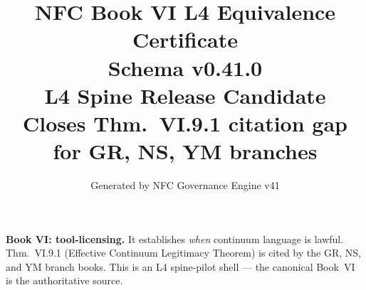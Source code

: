 \documentclass[11pt]{article}
\title{NFC Book VI L4 Equivalence Certificate\\[1ex]\large Schema v0.41.0\\[0.5ex]
\normalsize L4 Spine Release Candidate\\[0.5ex]
\small Closes Thm.~VI.9.1 citation gap for GR, NS, YM branches}
\author{Generated by NFC Governance Engine v41}
\date{}
\begin{document}
\maketitle
\tableofcontents
\bigskip
\noindent\textbf{Book VI: tool-licensing.} It establishes \emph{when} continuum
language is lawful. Thm.~VI.9.1 (Effective Continuum Legitimacy Theorem) is cited
by the GR, NS, and YM branch books. This is an L4 spine-pilot shell ---
the canonical Book~VI is the authoritative source.
\vspace{1em}

\end{document}

